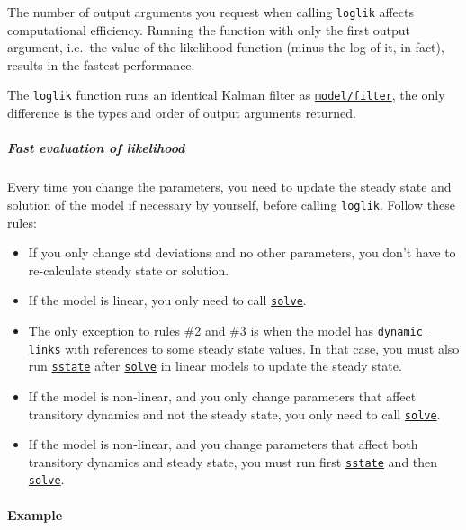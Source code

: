 The number of output arguments you request when calling \texttt{loglik}
affects computational efficiency. Running the function with only the
first output argument, i.e.~the value of the likelihood function (minus
the log of it, in fact), results in the fastest performance.

The \texttt{loglik} function runs an identical Kalman filter as
\href{model/filter}{\texttt{model/filter}}, the only difference is the
types and order of output arguments returned.

\subparagraph{Fast evaluation of
likelihood}

Every time you change the parameters, you need to update the steady
state and solution of the model if necessary by yourself, before calling
\texttt{loglik}. Follow these rules:

\begin{itemize}
\item
  If you only change std deviations and no other parameters, you don't
  have to re-calculate steady state or solution.
\item
  If the model is linear, you only need to call
  \href{model/solve}{\texttt{solve}}.
\item
  The only exception to rules \#2 and \#3 is when the model has
  \href{modellang/links}{\texttt{dynamic links}} with references to some
  steady state values. In that case, you must also run
  \href{model/sstate}{\texttt{sstate}} after
  \href{model/solve}{\texttt{solve}} in linear models to update the
  steady state.
\item
  If the model is non-linear, and you only change parameters that affect
  transitory dynamics and not the steady state, you only need to call
  \href{model/solve}{\texttt{solve}}.
\item
  If the model is non-linear, and you change parameters that affect both
  transitory dynamics and steady state, you must run first
  \href{model/sstate}{\texttt{sstate}} and then
  \href{model/solve}{\texttt{solve}}.
\end{itemize}

\paragraph{Example}


